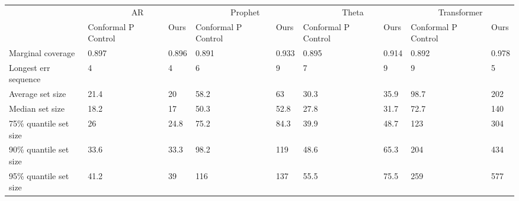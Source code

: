 \begin{tabular}{lllllllll}
\toprule
& \multicolumn{2}{c}{AR}& \multicolumn{2}{c}{Prophet}& \multicolumn{2}{c}{Theta}& \multicolumn{2}{c}{Transformer} \\
& Conformal P Control & Ours & Conformal P Control & Ours & Conformal P Control & Ours & Conformal P Control & Ours \\
\midrule
Marginal coverage & 0.897 & 0.896 & 0.891 & 0.933 & 0.895 & 0.914 & 0.892 & 0.978 \\
Longest err sequence & 4 & 4 & 6 & 9 & 7 & 9 & 9 & 5 \\
Average set size & 21.4 & 20 & 58.2 & 63 & 30.3 & 35.9 & 98.7 & 202 \\
Median set size & 18.2 & 17 & 50.3 & 52.8 & 27.8 & 31.7 & 72.7 & 140 \\
75\% quantile set size & 26 & 24.8 & 75.2 & 84.3 & 39.9 & 48.7 & 123 & 304 \\
90\% quantile set size & 33.6 & 33.3 & 98.2 & 119 & 48.6 & 65.3 & 204 & 434 \\
95\% quantile set size & 41.2 & 39 & 116 & 137 & 55.5 & 75.5 & 259 & 577 \\
\bottomrule
\end{tabular}
